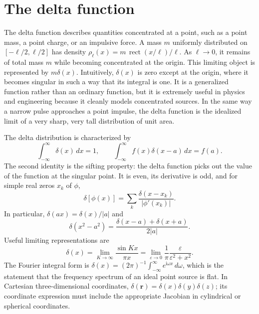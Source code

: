 \section{The delta function}

The delta function describes quantities concentrated at a point, such as a point mass, a point charge, or an impulsive force. A mass $m$ uniformly distributed on $[-\ell/2,\ell/2]$ has density $\rho_\ell(x)=m\,\operatorname{rect}(x/\ell)/\ell$. As $\ell\to0$, it remains of total mass $m$ while becoming concentrated at the origin. This limiting object is represented by $m\delta(x)$. Intuitively, $\delta(x)$ is zero except at the origin, where it becomes singular in such a way that its integral is one. It is a generalized function rather than an ordinary function, but it is extremely useful in physics and engineering because it cleanly models concentrated sources. In the same way a narrow pulse approaches a point impulse, the delta function is the idealized limit of a very sharp, very tall distribution of unit area.

The delta distribution is characterized by
\begin{equation}
\int_{-\infty}^{\infty}\delta(x)\,dx=1,
\qquad
\int_{-\infty}^{\infty}f(x)\delta(x-a)\,dx=f(a).
\end{equation}
The second identity is the sifting property: the delta function picks out the value of the function at the singular point. It is even, its derivative is odd, and for simple real zeros $x_k$ of $\phi$,
\begin{equation}
\delta[\phi(x)]=\sum_k\frac{\delta(x-x_k)}{|\phi'(x_k)|}.
\end{equation}
In particular, $\delta(ax)=\delta(x)/|a|$ and
\begin{equation}
\delta(x^2-a^2)=\frac{\delta(x-a)+\delta(x+a)}{2|a|}.
\end{equation}
Useful limiting representations are
\begin{equation}
\delta(x)=\lim_{K\to\infty}\frac{\sin Kx}{\pi x}
=\lim_{\varepsilon\to0}\frac{1}{\pi}\frac{\varepsilon}{\varepsilon^2+x^2}.
\end{equation}
The Fourier integral form is $\delta(x)=(2\pi)^{-1}\int_{-\infty}^{\infty}e^{\mathrm{i}\omega x}\,d\omega$, which is the statement that the frequency spectrum of an ideal point source is flat. In Cartesian three-dimensional coordinates, $\delta(\mathbf{r})=\delta(x)\delta(y)\delta(z)$; its coordinate expression must include the appropriate Jacobian in cylindrical or spherical coordinates.